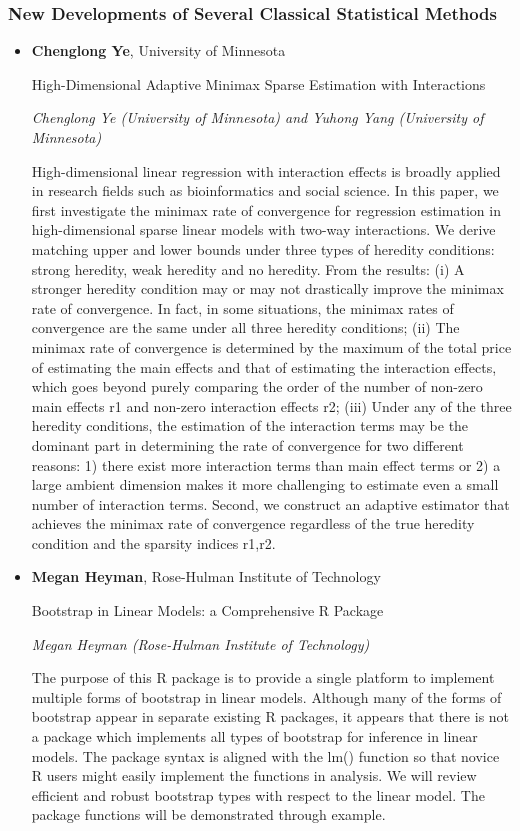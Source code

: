 \subsubsection*{New Developments of Several Classical Statistical Methods}

\begin{itemize}
\item \textbf{Chenglong Ye}, University of Minnesota

High-Dimensional Adaptive Minimax Sparse Estimation with Interactions

\emph{\footnotesize Chenglong Ye (University of Minnesota) and Yuhong Yang (University of Minnesota)}

High-dimensional linear regression with interaction effects is broadly applied in research fields such as bioinformatics and social science. In this paper, we first investigate the minimax rate of convergence for regression estimation in high-dimensional sparse linear models with two-way interactions. We derive matching upper and lower bounds under three types of heredity conditions: strong heredity, weak heredity and no heredity. From the results: (i) A stronger heredity condition may or may not drastically improve the minimax rate of convergence. In fact, in some situations, the minimax rates of convergence are the same under all three heredity conditions; (ii) The minimax rate of convergence is determined by the maximum of the total price of estimating the main effects and that of estimating the interaction effects, which goes beyond purely comparing the order of the number of non-zero main effects r1 and non-zero interaction effects r2; (iii) Under any of the three heredity conditions, the estimation of the interaction terms may be the dominant part in determining the rate of convergence for two different reasons: 1) there exist more interaction terms than main effect terms or 2) a large ambient dimension makes it more challenging to estimate even a small number of interaction terms. Second, we construct an adaptive estimator that achieves the minimax rate of convergence regardless of the true heredity condition and the sparsity indices r1,r2.

\item \textbf{Megan Heyman}, Rose-Hulman Institute of Technology

Bootstrap in Linear Models:  a Comprehensive R Package

\emph{\footnotesize Megan Heyman (Rose-Hulman Institute of Technology)}

The purpose of this R package is to provide a single platform to implement multiple forms of bootstrap in linear models.  Although many of the forms of bootstrap appear in separate existing R packages, it appears that there is not a package which implements all types of bootstrap for inference in linear models.  The package syntax is aligned with the lm() function so that novice R users might easily implement the functions in analysis.  We will review efficient and robust bootstrap types with respect to the linear model.  The package functions will be demonstrated through example.


\end{itemize}
